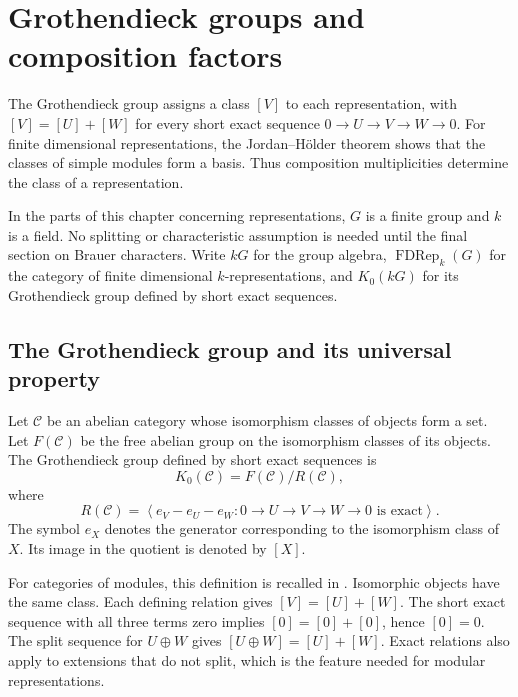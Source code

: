 \chapter{Grothendieck groups and composition factors}
\label{chap:library:kzero}

The Grothendieck group assigns a class $[V]$ to each representation, with
$[V]=[U]+[W]$ for every short exact sequence $0\to U\to V\to W\to0$.
For finite dimensional representations, the Jordan--H\"older theorem shows
that the classes of simple modules form a basis. Thus composition
multiplicities determine the class of a representation.

In the parts of this chapter concerning representations, $G$ is a finite
group and $k$ is a field. No splitting or characteristic assumption is needed
until the final section on Brauer characters. Write $kG$ for the group algebra,
$\operatorname{FDRep}_k(G)$ for the category of finite dimensional
$k$-representations, and $K_0(kG)$ for its Grothendieck group defined by short exact sequences.

\section{The Grothendieck group and its universal property}
\label{lib:kzero:presentation}

\begin{definition}
Let $\mathcal C$ be an abelian category whose isomorphism classes of
objects form a set.
Let $F(\mathcal C)$ be the free abelian group on the isomorphism classes
of its objects.
The Grothendieck group defined by short exact sequences is
\[
 K_0(\mathcal C)=F(\mathcal C)/R(\mathcal C),
\]
where
\[
 R(\mathcal C)=
 \left\langle e_V-e_U-e_W:
 0\longrightarrow U\longrightarrow V\longrightarrow W\longrightarrow0
 \text{ is exact}\right\rangle.
\]
The symbol $e_X$ denotes the generator corresponding to the isomorphism
class of $X$. Its image in the quotient is denoted by $[X]$.
\end{definition}

For categories of modules, this definition is recalled in
\cite[Appendix, p.~163]{Serre1977}.
Isomorphic objects have the same class. Each defining relation gives
$[V]=[U]+[W]$. The short exact
sequence with all three terms zero implies
$[0]=[0]+[0]$, hence
$[0]=0$. The split sequence for $U\oplus W$ gives
$[U\oplus W]=[U]+[W]$. Exact relations also apply to extensions that do not
split, which is the feature needed for modular representations.

